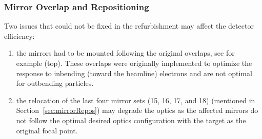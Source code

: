 \subsubsection{Mirror Overlap and Repositioning}
\label{sec:possibleInefficiency}

Two issues that could not be fixed in the refurbishment may affect the detector efficiency:

\begin{enumerate}
  \item the mirrors had to be mounted following the original overlaps, see for example  (top).
    These overlaps were originally implemented to optimize the response to inbending (toward the beamline) electrons
    and are not optimal for outbending particles.
  \item the relocation of the last four mirror sets (15, 16, 17, and 18) (mentioned in Section~\ref{sec:mirrorRepos})
    may degrade the optics as the affected mirrors do not follow the optimal desired optics configuration with the
    target as the original focal point.
\end{enumerate}

